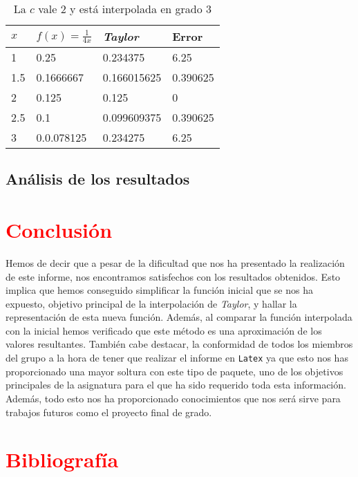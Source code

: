 \documentclass[a4paper,12pt]{article}
\begin{document}
\begin{table}[!hbt]
\begin{center}
\begin{tabular}[c]{||l | l ||l|l||}
\hline
\hline
$x$  & $f(x)=\frac{1}{4x}$ & {\em Taylor} & Error \\
\hline
1 &0.25& 0.234375 & 6.25 \\
\hline
1.5 &0.1666667&0.166015625&  0.390625\\
\hline
2 &0.125 &0.125 &  0 \\
\hline
2.5 &0.1 &0.099609375 &  0.390625 \\
\hline
3 &  0.0.078125 &  0.234275& 6.25  \\
\hline
\hline
\end{tabular}
\caption{La $c$ vale 2 y está interpolada en grado 3}
\end{center}
\end{table}
\newpage
\subsection{Análisis de los resultados}
\newpage
\section{\textcolor{red}{Conclusión}}
Hemos de decir que a pesar de la dificultad que nos ha presentado la realización de este informe, nos encontramos  satisfechos con los resultados obtenidos. Esto implica que hemos conseguido simplificar la función inicial que se nos ha expuesto, objetivo principal de la interpolación de {\em Taylor}, y hallar la representación de esta nueva función.
Además, al comparar  la función interpolada con la inicial hemos verificado que este método es una  aproximación de los valores resultantes. 
También cabe destacar, la conformidad de todos los miembros del grupo a la hora de tener que realizar el informe en {\tt Latex} ya que esto nos has proporcionado una mayor soltura con este tipo de paquete, uno de los objetivos principales de la asignatura para el que ha sido requerido toda esta información. Además, todo esto nos ha proporcionado conocimientos 
que nos será sirve para trabajos futuros como el proyecto final de grado.
\newpage
\section{\textcolor{red}{Bibliografía}}
\bigskip
\end{document}
